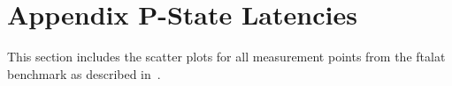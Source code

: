 %

\chapter{Appendix P-State Latencies}
\label{app:pstate_latencies_scatter_complete}
This section includes the scatter plots for all measurement points from the ftalat benchmark as described in~.

